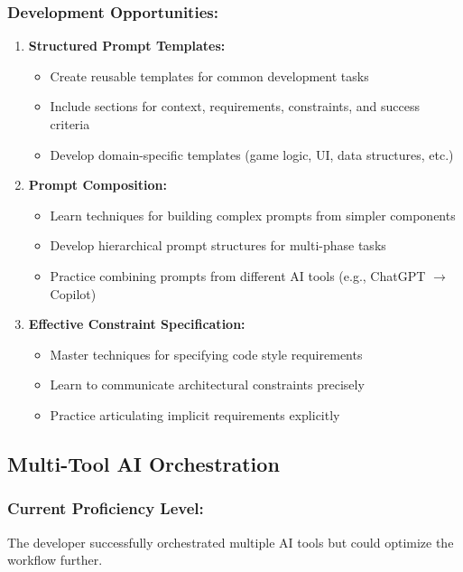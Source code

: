\documentclass[12pt,a4paper]{article}
\begin{document}
\subsubsection*{Development Opportunities:}

\begin{enumerate}
    \item \textbf{Structured Prompt Templates:}
    \begin{itemize}
        \item Create reusable templates for common development tasks
        \item Include sections for context, requirements, constraints, and success criteria
        \item Develop domain-specific templates (game logic, UI, data structures, etc.)
    \end{itemize}
    
    \item \textbf{Prompt Composition:}
    \begin{itemize}
        \item Learn techniques for building complex prompts from simpler components
        \item Develop hierarchical prompt structures for multi-phase tasks
        \item Practice combining prompts from different AI tools (e.g., ChatGPT $\rightarrow$ Copilot)
    \end{itemize}
    
    \item \textbf{Effective Constraint Specification:}
    \begin{itemize}
        \item Master techniques for specifying code style requirements
        \item Learn to communicate architectural constraints precisely
        \item Practice articulating implicit requirements explicitly
    \end{itemize}
\end{enumerate}

\subsection{Multi-Tool AI Orchestration}

\subsubsection*{Current Proficiency Level:}
The developer successfully orchestrated multiple AI tools but could optimize the workflow further.
\end{document}
